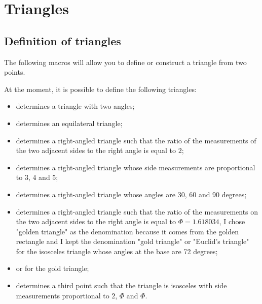 \section{Triangles}

\subsection{Definition of triangles }
The following macros will allow you to define or construct a triangle from  two points.

 At the moment, it is possible to define the following triangles:
 \begin{itemize}
\item  {}  determines a triangle with two angles;
\item  {}  determines an equilateral triangle;
\item {} determines a right-angled triangle such that the ratio of the measurements of the two adjacent sides to the right angle is equal to $2$;
\item {} determines a right-angled triangle whose side measurements are proportional to 3, 4 and 5;
\item {} determines a right-angled triangle whose angles are 30, 60 and 90 degrees;
\item {} determines a right-angled triangle such that the ratio of the measurements on the two adjacent sides to the right angle is equal to $\Phi=1.618034$, I chose "golden triangle" as the denomination because it comes from the golden rectangle and I kept the denomination "gold triangle" or "Euclid's triangle" for the isosceles triangle whose angles at the base are 72 degrees;

\item  {} or  for the gold triangle;

\item {} determines a third point such that the triangle is isosceles with side measurements proportional to $2$, $\Phi$ and $\Phi$.
\end{itemize}

